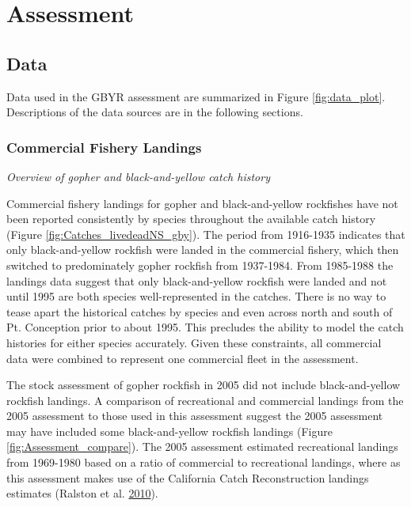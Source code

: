 \documentclass[12pt,]{article}
\begin{document}
\section{Assessment}\label{assessment}

\subsection{Data}\label{data}

Data used in the GBYR assessment are summarized in Figure
\ref{fig:data_plot}. Descriptions of the data sources are in the
following sections.

\subsubsection{Commercial Fishery
Landings}\label{commercial-fishery-landings}

\emph{Overview of gopher and black-and-yellow catch history}

Commercial fishery landings for gopher and black-and-yellow rockfishes
have not been reported consistently by species throughout the available
catch history (Figure \ref{fig:Catches_livedeadNS_gby}). The period from
1916-1935 indicates that only black-and-yellow rockfish were landed in
the commercial fishery, which then switched to predominately gopher
rockfish from 1937-1984. From 1985-1988 the landings data suggest that
only black-and-yellow rockfish were landed and not until 1995 are both
species well-represented in the catches. There is no way to tease apart
the historical catches by species and even across north and south of Pt.
Conception prior to about 1995. This precludes the ability to model the
catch histories for either species accurately. Given these constraints,
all commercial data were combined to represent one commercial fleet in
the assessment.

The stock assessment of gopher rockfish in 2005 did not include
black-and-yellow rockfish landings. A comparison of recreational and
commercial landings from the 2005 assessment to those used in this
assessment suggest the 2005 assessment may have included some
black-and-yellow rockfish landings (Figure
\ref{fig:Assessment_compare}). The 2005 assessment estimated
recreational landings from 1969-1980 based on a ratio of commercial to
recreational landings, where as this assessment makes use of the
California Catch Reconstruction landings estimates (Ralston et al.
\protect\hyperlink{ref-Ralston2010}{2010}).
\end{document}
